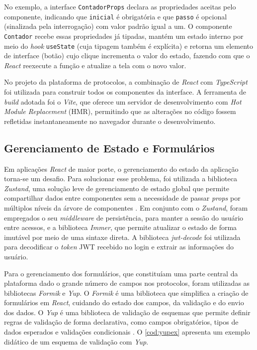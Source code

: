 No exemplo, a interface \texttt{ContadorProps} declara as propriedades aceitas pelo componente, indicando que \texttt{inicial} é obrigatória e que \texttt{passo} é opcional (sinalizada pela interrogação) com valor padrão igual a um. O componente \texttt{Contador} recebe essas propriedades já tipadas, mantém um estado interno por meio do \textit{hook} \texttt{useState} (cuja tipagem também é explícita) e retorna um elemento de interface (botão) cujo clique incrementa o valor do estado, fazendo com que o \textit{React} reexecute a função e atualize a tela com o novo valor.

No projeto da plataforma de protocolos, a combinação de \textit{React} com \textit{TypeScript} foi utilizada para construir todos os componentes da interface. A ferramenta de \textit{build} adotada foi o \textit{Vite}, que oferece um servidor de desenvolvimento com \textit{Hot Module Replacement} (HMR), permitindo que as alterações no código fossem refletidas instantaneamente no navegador durante o desenvolvimento.

\subsection{Gerenciamento de Estado e Formulários}

Em aplicações \textit{React} de maior porte, o gerenciamento do estado da aplicação torna-se um desafio. Para solucionar esse problema, foi utilizada a biblioteca \textit{Zustand}, uma solução leve de gerenciamento de estado global que permite compartilhar dados entre componentes sem a necessidade de passar \textit{props} por múltiplos níveis da árvore de componentes \cite{Zustand2024}. Em conjunto com o \textit{Zustand}, foram empregados o seu \textit{middleware} de persistência, para manter a sessão do usuário entre acessos, e a biblioteca \textit{Immer}, que permite atualizar o estado de forma imutável por meio de uma sintaxe direta. A biblioteca \textit{jwt-decode} foi utilizada para decodificar o \textit{token} JWT recebido no login e extrair as informações do usuário.

Para o gerenciamento dos formulários, que constituíam uma parte central da plataforma dado o grande número de campos nos protocolos, foram utilizadas as bibliotecas \textit{Formik} e \textit{Yup}. O \textit{Formik} é uma biblioteca que simplifica a criação de formulários em \textit{React}, cuidando do estado dos campos, da validação e do envio dos dados. O \textit{Yup} é uma biblioteca de validação de esquemas que permite definir regras de validação de forma declarativa, como campos obrigatórios, tipos de dados esperados e validações condicionais \cite{Formik2024}. O \autoref{cod:yupex} apresenta um exemplo didático de um esquema de validação com \textit{Yup}.


